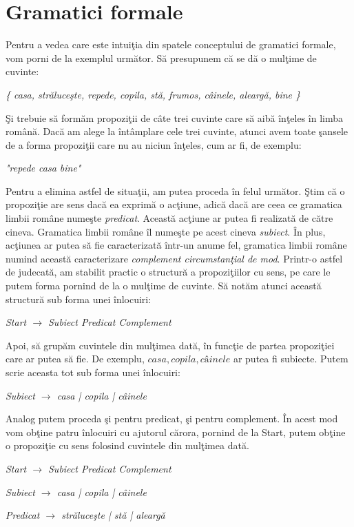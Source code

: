 \chapter{Gramatici formale}
\label{ch:gramatici}

Pentru a vedea care este intuiţia din spatele conceptului de gramatici formale, vom porni de la exemplul următor. Să presupunem că se dă o mulţime de cuvinte:

\textit{ \{ casa, străluceşte, repede, copila, stă, frumos, câinele, aleargă, bine \} }

Şi trebuie să formăm propoziţii de câte trei cuvinte care să aibă înţeles în limba română. Dacă am alege la întâmplare cele trei cuvinte, atunci avem toate şansele de a forma propoziţii care nu au niciun înţeles, cum ar fi, de exemplu:

\textit{ "repede casa bine" }

Pentru a elimina astfel de situaţii, am putea proceda în felul următor. Ştim că o propoziţie are sens dacă ea exprimă o acţiune, adică dacă are ceea ce gramatica limbii române numeşte \textit{predicat}. Această acţiune ar putea fi realizată de către cineva. Gramatica limbii române îl numeşte pe acest cineva \textit{subiect}. În plus, acţiunea ar putea să fie caracterizată într-un anume fel, gramatica limbii române numind această caracterizare \textit{complement circumstanţial de mod}. Printr-o astfel de judecată, am stabilit practic o structură a propoziţiilor cu sens, pe care le putem forma pornind de la o mulţime de cuvinte. Să notăm atunci această structură sub forma unei înlocuiri:

\textit{ Start $\rightarrow$ Subiect Predicat Complement }

Apoi, să grupăm cuvintele din mulţimea dată, în funcţie de partea propoziţiei care ar putea să fie. De exemplu, $casa, copila, câinele$ ar putea fi subiecte. Putem scrie aceasta tot sub forma unei înlocuiri:

\textit{ Subiect $\rightarrow$ casa | copila | câinele }

Analog putem proceda şi pentru predicat, şi pentru complement. În acest mod vom obţine patru înlocuiri cu ajutorul cărora, pornind de la Start, putem obţine o propoziţie cu sens folosind cuvintele din mulţimea dată.

\textit{ Start $\rightarrow$ Subiect Predicat Complement }

\textit{ Subiect $\rightarrow$ casa | copila | câinele }

\textit{ Predicat $\rightarrow$ străluceşte | stă | aleargă }

